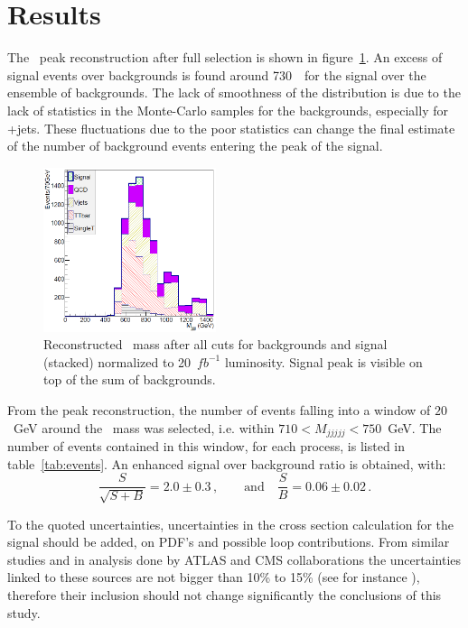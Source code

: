 \section{Results}
\label{sec:Pres}

The \Tp~peak reconstruction after full selection is shown in figure~\ref{fig:M5J}. An excess of signal events over backgrounds is found around 730~\GeVcc~for the signal over the ensemble of backgrounds. The lack of smoothness of the distribution is due to the lack of statistics in the Monte-Carlo samples for the  backgrounds, especially for \W+jets. These fluctuations due to the poor statistics can change the final estimate of the number of background events entering the peak of the signal. 

\begin{figure}[!Hhtbp]
  \begin{center}
    \includegraphics[width=0.45\textwidth]{figs/Pheno/Final.png}
    \caption{Reconstructed \Tp~mass after all cuts for backgrounds and signal (stacked) normalized to 20~$fb^{-1}$ luminosity. Signal peak is visible on top of the sum of backgrounds.}
    \label{fig:M5J}
  \end{center}
\end{figure}

From the peak reconstruction, the number of events falling into a window of $20$~GeV around the \Tp~mass was selected, i.e. within $710 < M_{jjjjj} < 750$~GeV. The number of events contained in this window, for each process, is listed in table~\ref{tab:events}. An enhanced signal over background ratio is obtained, with:
\begin{equation}
\frac{S}{\sqrt{S+B}}=2.0\pm 0.3\,, \qquad \mbox{and} \quad \frac{S}{B}=0.06\pm 0.02\,. 
\end{equation}

To the quoted uncertainties, uncertainties in the cross section calculation for the signal should be added, on PDF's and possible loop contributions. From similar studies and in analysis done by ATLAS and CMS collaborations the uncertainties linked to these sources are not bigger than 10\% to 15\% (see for instance \cite{Aad:2011yn}), therefore their inclusion should not change significantly the conclusions of this study.


